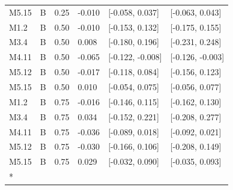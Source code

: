 \begin{longtable}[t]{llrlll}
M5.15 & B & 0.25 & -0.010 & {}[-0.058, 0.037] & {}[-0.063, 0.043]\\
M1.2 & B & 0.50 & -0.010 & {}[-0.153, 0.132] & {}[-0.175, 0.155]\\
M3.4 & B & 0.50 & 0.008 & {}[-0.180, 0.196] & {}[-0.231, 0.248]\\
M4.11 & B & 0.50 & -0.065 & {}[-0.122, -0.008] & {}[-0.126, -0.003]\\
M5.12 & B & 0.50 & -0.017 & {}[-0.118, 0.084] & {}[-0.156, 0.123]\\
M5.15 & B & 0.50 & 0.010 & {}[-0.054, 0.075] & {}[-0.056, 0.077]\\
M1.2 & B & 0.75 & -0.016 & {}[-0.146, 0.115] & {}[-0.162, 0.130]\\
M3.4 & B & 0.75 & 0.034 & {}[-0.152, 0.221] & {}[-0.208, 0.277]\\
M4.11 & B & 0.75 & -0.036 & {}[-0.089, 0.018] & {}[-0.092, 0.021]\\
M5.12 & B & 0.75 & -0.030 & {}[-0.166, 0.106] & {}[-0.208, 0.149]\\
M5.15 & B & 0.75 & 0.029 & {}[-0.032, 0.090] & {}[-0.035, 0.093]\\*
\end{longtable}
